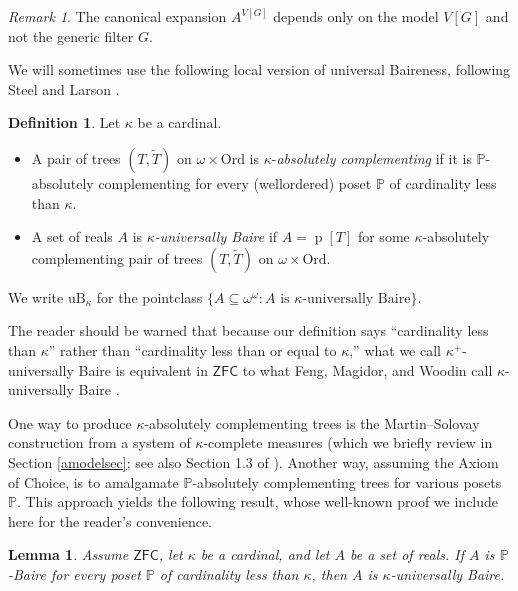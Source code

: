 \documentclass[fleqn, 11pt]{amsart}
\theoremstyle{plain}
\newtheorem{lem}[thm]{Lemma} \newtheorem*{lem*}{Lemma}
\theoremstyle{definition}
\newtheorem{defn}[thm]{Definition} \newtheorem*{defn*}{Definition}
\theoremstyle{remark}
\newtheorem{rem}[thm]{Remark} \newtheorem*{rem*}{Remark}
\newcommand{\Ord}{\mathrm{Ord}}
\newcommand{\uB}{\mathrm{uB}}
\DeclareMathOperator{\p}{p}
\begin{document}
\begin{rem}\label{canexprem} The canonical expansion $A^{V[G]}$ depends only on the model $V[G]$ and not the generic filter $G$. 
\end{rem} 


We will sometimes use the following local version of universal Baireness, following Steel \cite{SteDMT} and Larson \cite{LarStationaryTower}.

\begin{defn}\label{defn-lt-kappa-uB}
Let $\kappa$ be a cardinal.
\begin{itemize}
 \item A pair of trees $(T,\tilde{T})$ on $\omega \times \Ord$ is
 $\kappa$-\emph{absolutely complementing} if
 it is $\mathbb{P}$-absolutely complementing for every 
 (wellordered) poset $\mathbb{P}$ of cardinality less than $\kappa$.
 \item A set of reals $A$ is \emph{$\kappa$-universally Baire} if $A = \p[T]$ for some $\kappa$-absolutely complementing pair of trees $(T,\tilde{T})$ on $\omega \times \Ord$.
\end{itemize}
We write $\uB_{\kappa}$ for the pointclass $\{ A \subseteq \omega^\omega : A \text{ is $\kappa$-universally Baire}\}$. 
\end{defn}

The reader should be warned that because 
our definition says ``cardinality less than $\kappa$'' rather than ``cardinality less than or equal to $\kappa$,'' what we call $\kappa^+$-universally Baire is equivalent
in $\mathsf{ZFC}$ to what Feng, Magidor, and Woodin call $\kappa$-universally Baire \cite[Theorem 2.1]{FenMagWoo}.

One way to produce $\kappa$-absolutely complementing trees is the Martin--Solovay construction from a system of $\kappa$-complete measures (which we briefly review in Section \ref{amodelsec}; see also Section 1.3 of \cite{LarStationaryTower}).
Another way, assuming the Axiom of Choice, is to amalgamate $\mathbb{P}$-absolutely complementing trees for various posets $\mathbb{P}$.
This approach yields the following result, whose well-known proof we include here for the reader's convenience.

\begin{lem}
 Assume $\mathsf{ZFC}$, let $\kappa$ be a cardinal, and let $A$ be a set of reals.
 If $A$ is $\mathbb{P}$-Baire for every poset $\mathbb{P}$ of cardinality less than $\kappa$,
 then $A$ is $\kappa$-universally Baire.
\end{lem}
\end{document}
